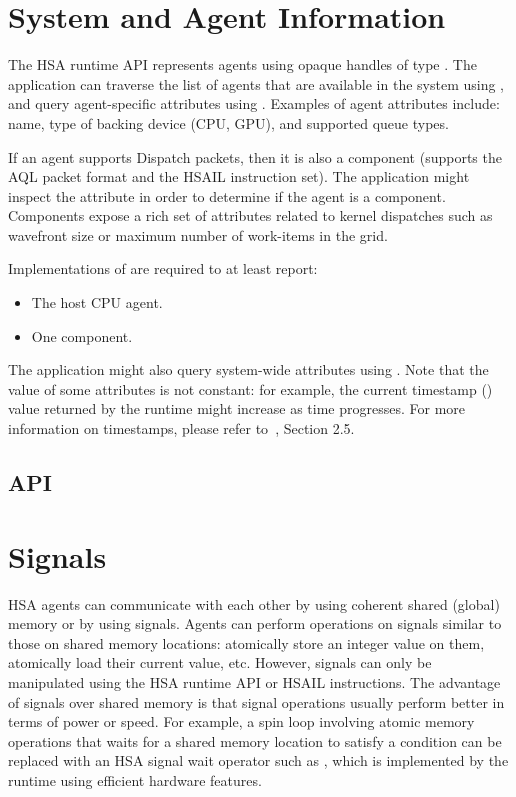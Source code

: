 \documentclass[final,oneside]{book}
\begin{document}
\section{System and Agent Information}
\label{sec:agentinfo}

The HSA runtime API represents agents using opaque handles of type
. The application can traverse the list of agents that are
available in the system using , and query
agent-specific attributes using . Examples of agent
attributes include: name, type of backing device (CPU, GPU), and supported queue types.

If an agent supports Dispatch packets, then it is also a component (supports the
AQL packet format and the HSAIL instruction set). The application might inspect
the  attribute in order to determine if the agent
is a component. Components expose a rich set of attributes related to kernel
dispatches such as wavefront size or maximum number of work-items in the grid.

Implementations of  are required to at least report:
\begin{itemize}[itemsep=1pt,topsep=3pt,partopsep=0pt]
\item The host CPU agent.
\item One component.
\end{itemize}

The application might also query system-wide attributes using
. Note that the value of some attributes is not
constant: for example, the current timestamp
() value returned by the runtime might
increase as time progresses. For more information on timestamps, please refer
to~\cite{sar}, Section 2.5.

\subsection{API}


\section{Signals}\label{sec:signals}

HSA agents can communicate with each other by using coherent shared (global)
memory or by using signals. Agents can perform operations on signals similar to
those on shared memory locations: atomically store an integer value on them,
atomically load their current value, etc. However, signals can only be
manipulated using the HSA runtime API or HSAIL instructions. The advantage of
signals over shared memory is that signal operations usually perform better in
terms of power or speed. For example, a spin loop involving atomic memory
operations that waits for a shared memory location to satisfy a condition can be
replaced with an HSA signal wait operator such as
, which is implemented by the runtime using
efficient hardware features.
\end{document}
